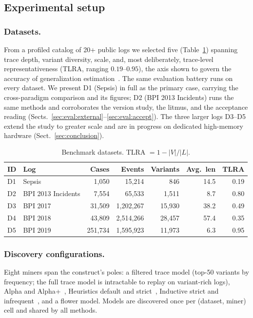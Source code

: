 \documentclass[runningheads]{llncs}
\begin{document}
\subsection{Experimental setup}
\label{sec:eval:setup}

\subsubsection{Datasets.}
From a profiled catalog of 20+ public logs we selected five (Table~\ref{tab:datasets}) spanning trace depth, variant diversity, scale, and, most deliberately, trace-level representativeness (TLRA, ranging $0.19$--$0.95$), the axis shown to govern the accuracy of generalization estimation~\cite{karunaratne2024representativeness}. The same evaluation battery runs on every dataset. We present D1 (Sepsis) in full as the primary case, carrying the cross-paradigm comparison and its figures; D2 (BPI 2013 Incidents) runs the same methods and corroborates the version study, the litmus, and the acceptance reading (Sects.~\ref{sec:eval:external}--\ref{sec:eval:accept}). The three larger logs D3--D5 extend the study to greater scale and are in progress on dedicated high-memory hardware (Sect.~\ref{sec:conclusion}).

\begin{table}[t]
\centering
\caption{Benchmark datasets. TLRA $=1-|V|/|L|$.}
\label{tab:datasets}
\setlength{\tabcolsep}{3pt}
\footnotesize
\begin{tabular}{@{}llrrrrr@{}}
\toprule
ID & Log & Cases & Events & Variants & Avg.\ len & TLRA \\
\midrule
D1 & Sepsis~\cite{mannhardt2016sepsis} & 1{,}050 & 15{,}214 & 846 & 14.5 & 0.19 \\
D2 & BPI 2013 Incidents & 7{,}554 & 65{,}533 & 1{,}511 & 8.7 & 0.80 \\
D3 & BPI 2017 & 31{,}509 & 1{,}202{,}267 & 15{,}930 & 38.2 & 0.49 \\
D4 & BPI 2018 & 43{,}809 & 2{,}514{,}266 & 28{,}457 & 57.4 & 0.35 \\
D5 & BPI 2019 & 251{,}734 & 1{,}595{,}923 & 11{,}973 & 6.3 & 0.95 \\
\bottomrule
\end{tabular}
\end{table}

\subsubsection{Discovery configurations.}
Eight miners span the construct's poles: a filtered trace model (top-50 variants by frequency; the full trace model is intractable to replay on variant-rich logs), Alpha and Alpha+~\cite{vanderaalst2004alpha}, Heuristics default and strict~\cite{weijters2006hm}, Inductive strict and infrequent~\cite{leemans2013im,leemans2014imf}, and a flower model. Models are discovered once per (dataset, miner) cell and shared by all methods.
\end{document}
